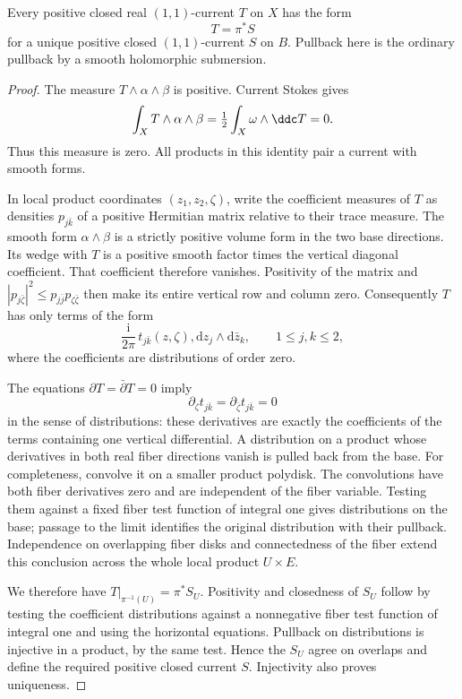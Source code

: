 \begin{lemma}\label{lem:elliptic-positive-current-descent}
Every positive closed real $(1,1)$-current $T$ on $X$ has the form
\[
 T=\pi^*S
\]
for a unique positive closed $(1,1)$-current $S$ on $B$. Pullback here is the ordinary pullback by a smooth holomorphic submersion.
\end{lemma}
\begin{proof}
The measure $T\wedge\alpha\wedge\beta$ is positive. Current Stokes gives
\[
 \int_XT\wedge\alpha\wedge\beta
   =\tfrac12\int_X\omega\wedge\ddc T=0.
\]
Thus this measure is zero. All products in this identity pair a current with smooth forms.

In local product coordinates $(z_1,z_2,\zeta)$, write the coefficient measures of $T$ as densities $p_{j\bar k}$ of a positive Hermitian matrix relative to their trace measure. The smooth form $\alpha\wedge\beta$ is a strictly positive volume form in the two base directions. Its wedge with $T$ is a positive smooth factor times the vertical diagonal coefficient. That coefficient therefore vanishes. Positivity of the matrix and
$|p_{j\bar\zeta}|^2\leq p_{j\bar j}p_{\zeta\bar\zeta}$ then make its entire vertical row and column zero. Consequently $T$ has only terms of the form
\[
 \frac{\mathrm{i}}{2\pi}\,t_{j\bar k}(z,\zeta),
       \mathrm{d}z_j\wedge\mathrm{d}\bar z_k,
       \qquad 1\leq j,k\leq2,
\]
where the coefficients are distributions of order zero.

The equations $\partial T=\bar\partial T=0$ imply
\[
 \partial_\zeta t_{j\bar k}
       =\partial_{\bar\zeta}t_{j\bar k}=0
\]
in the sense of distributions: these derivatives are exactly the coefficients of the terms containing one vertical differential. A distribution on a product whose derivatives in both real fiber directions vanish is pulled back from the base. For completeness, convolve it on a smaller product polydisk. The convolutions have both fiber derivatives zero and are independent of the fiber variable. Testing them against a fixed fiber test function of integral one gives distributions on the base; passage to the limit identifies the original distribution with their pullback. Independence on overlapping fiber disks and connectedness of the fiber extend this conclusion across the whole local product $U\times E$.

We therefore have $T|_{\pi^{-1}(U)}=\pi^*S_U$. Positivity and closedness of $S_U$ follow by testing the coefficient distributions against a nonnegative fiber test function of integral one and using the horizontal equations. Pullback on distributions is injective in a product, by the same test. Hence the $S_U$ agree on overlaps and define the required positive closed current $S$. Injectivity also proves uniqueness.
\end{proof}

